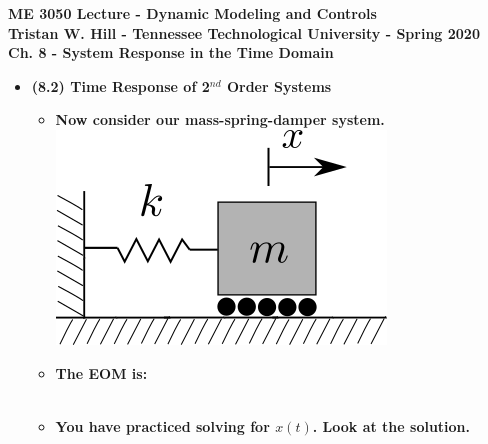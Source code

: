 \documentclass[11pt]{article}
\begin{document}
\textbf{ \LARGE ME 3050 Lecture - Dynamic Modeling and Controls} \vspace{3mm}\\
\textbf{ \hspace*{5mm}Tristan W. Hill - Tennessee Technological University - Spring 2020 } \vspace{3mm}\\


\textbf{ \LARGE Ch. 8 - System Response in the Time Domain} \\

\begin{itemize}


\item \textbf{ \LARGE (8.2) Time Response of 2$^{nd}$ Order Systems} \\

\begin{itemize}


\item \textbf{ \Large Now consider our mass-spring-damper system.}\\

			\includegraphics[scale=.5]{mass_spring_01.png} \\

\item \textbf{ \Large The EOM is:}\\

	 \\

\item \textbf{ \Large You have practiced solving for $x(t)$. Look at the solution. } \vspace{3mm}\\


\end{itemize}
\end{itemize}
\end{document}
